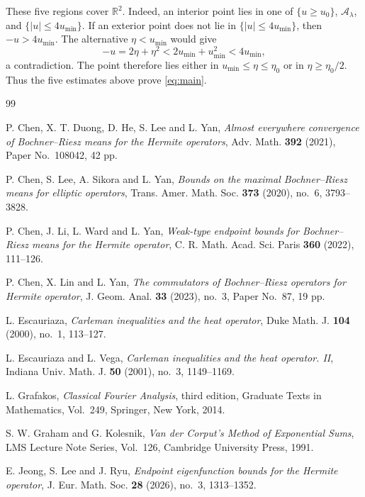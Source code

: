 \documentclass[11pt,a4paper]{amsart}
\numberwithin{equation}{section}
\newcommand{\R}{\mathbb R}
\begin{document}
These five regions cover \(\R^2\). Indeed, an interior point lies in one of
\(\{u\ge u_0\}\), \(\mathcal A_\lambda\), and
\(\{|u|\le4u_{\mathrm{min}}\}\). If an exterior point does not lie in
\(\{|u|\le4u_{\mathrm{min}}\}\), then \(-u>4u_{\mathrm{min}}\). The alternative
\(\eta<u_{\mathrm{min}}\) would give
\[
 -u=2\eta+\eta^2
 <2u_{\mathrm{min}}+u_{\mathrm{min}}^2<4u_{\mathrm{min}},
\]
a contradiction. The point therefore lies either in
\(u_{\mathrm{min}}\le\eta\le\eta_0\) or in \(\eta\ge\eta_0/2\). Thus
the five estimates above prove \eqref{eq:main}.



\begin{thebibliography}{99}

P. Chen, X. T. Duong, D. He, S. Lee and L. Yan,
\emph{Almost everywhere convergence of Bochner--Riesz means for the Hermite
operators},
Adv. Math. \textbf{392} (2021), Paper No.~108042, 42 pp.

P. Chen, S. Lee, A. Sikora and L. Yan,
\emph{Bounds on the maximal Bochner--Riesz means for elliptic operators},
Trans. Amer. Math. Soc. \textbf{373} (2020), no.~6, 3793--3828.

P. Chen, J. Li, L. Ward and L. Yan,
\emph{Weak-type endpoint bounds for Bochner--Riesz means for the Hermite
operator},
C. R. Math. Acad. Sci. Paris \textbf{360} (2022), 111--126.

P. Chen, X. Lin and L. Yan,
\emph{The commutators of Bochner--Riesz operators for Hermite operator},
J. Geom. Anal. \textbf{33} (2023), no.~3, Paper No.~87, 19 pp.

L. Escauriaza,
\emph{Carleman inequalities and the heat operator},
Duke Math. J. \textbf{104} (2000), no.~1, 113--127.

L. Escauriaza and L. Vega,
\emph{Carleman inequalities and the heat operator. II},
Indiana Univ. Math. J. \textbf{50} (2001), no.~3, 1149--1169.

L. Grafakos,
\emph{Classical Fourier Analysis}, third edition,
Graduate Texts in Mathematics, Vol.~249,
Springer, New York, 2014.

S. W. Graham and G. Kolesnik,
\emph{Van der Corput's Method of Exponential Sums},
LMS Lecture Note Series, Vol.~126,
Cambridge University Press, 1991.

E. Jeong, S. Lee and J. Ryu,
\emph{Endpoint eigenfunction bounds for the Hermite operator},
J. Eur. Math. Soc. \textbf{28} (2026), no.~3, 1313--1352.


\end{thebibliography}
\end{document}
